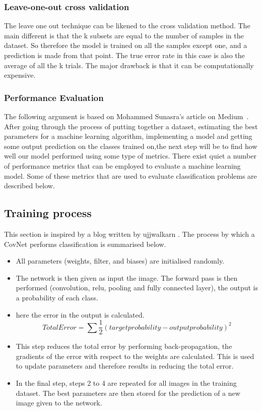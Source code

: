 \documentclass[12pt, a4paper,oneside]{report}
\begin{document}
\subsubsection{Leave-one-out cross validation}
The leave one out technique can be likened to the cross validation method. The main different is that the k subsets are equal to the number of samples in the dataset. So therefore the model is trained on all the samples except one, and a prediction is made from that point. The true error rate in this case is also the average of all the k trials. The major drawback is that it can be computationally expensive.


\subsubsection{Performance Evaluation}
The following argument is based on Mohammed Sunasra's article on Medium~\cite{performance}.
After going through the process of putting together a dataset, estimating the best parameters for a machine learning algorithm, implementing a model and getting some output prediction on the classes trained on,the next step will be to find how well our model performed using some type of metrics. There exist quiet a number of performance metrics that can be employed to evaluate a machine learning model. Some of these metrics that are used to evaluate classification problems are described below.






\subsection{Training process}
This section is inspired by a blog written by ujjwalkarn \cite{cnnonline}. The process by which a CovNet performs classification is summarised below.

\begin{itemize}
	\item All parameters (weights, filter, and biases) are initialised randomly.
	\item The network is then given as input the image. The forward pass is then performed (convolution, relu, pooling and fully connected layer),  the output is a probability of each class.
	\item here the error in the output is calculated.
	\[Total Error = \sum  \frac{1}{2} (target probability - output probability) ^2 \]
	\item This step reduces the total error by performing back-propagation, the gradients of the error with respect to the weights are calculated. This is used to update parameters and therefore results in reducing the total error.
	\item In the final step, steps 2 to 4 are repeated for all images in the training dataset. The best parameters are then stored for the prediction of a new image given to the network.\newline 
	
\end{itemize} 
\end{document}
